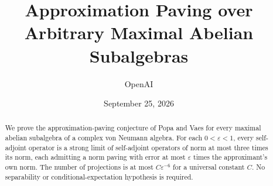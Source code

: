 \documentclass[11pt]{article}
\title{Approximation Paving over Arbitrary Maximal Abelian Subalgebras}
\author{OpenAI}
\date{September 25, 2026}
\theoremstyle{definition}
\theoremstyle{remark}
\numberwithin{equation}{section}
\begin{document}
\maketitle
\begin{abstract}
We prove the approximation-paving conjecture of Popa and Vaes for every
maximal abelian subalgebra of a complex von Neumann algebra. For each
\(0<\varepsilon<1\), every self-adjoint operator is a strong limit of
self-adjoint operators of norm at most three times its norm, each admitting a
norm paving with error at most \(\varepsilon\) times the approximant's own
norm. The number of projections is at most \(C\varepsilon^{-6}\) for a
universal constant \(C\). No separability or conditional-expectation
hypothesis is required.
\end{abstract}

\clearpage
\tableofcontents
\clearpage



\FloatBarrier



\clearpage

\end{document}
